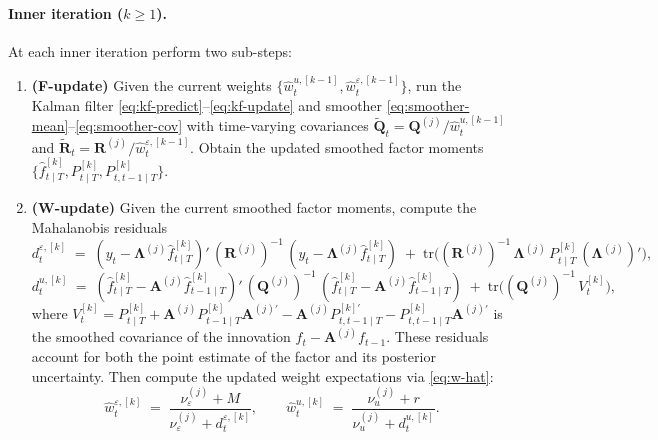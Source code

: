 \documentclass[11pt, a4paper, oneside]{article}
\newcommand{\mL}{\boldsymbol{\Lambda}}
\newcommand{\mA}{\mathbf{A}}
\newcommand{\mR}{\mathbf{R}}
\newcommand{\mQ}{\mathbf{Q}}
\begin{document}
\paragraph{Inner iteration ($k \geq 1$).}
At each inner iteration perform two sub-steps:
\begin{enumerate}[leftmargin=1.5em, itemsep=3pt]
    \item \textbf{(F-update)} Given the current weights
          $\{\hat{w}^{u,[k-1]}_t, \hat{w}^{\varepsilon,[k-1]}_t\}$, run
          the Kalman filter \eqref{eq:kf-predict}--\eqref{eq:kf-update}
          and smoother \eqref{eq:smoother-mean}--\eqref{eq:smoother-cov}
          with time-varying covariances
          $\tilde{\mQ}_t = \mQ^{(j)} / \hat{w}^{u,[k-1]}_t$ and
          $\tilde{\mR}_t = \mR^{(j)} / \hat{w}^{\varepsilon,[k-1]}_t$.
          Obtain the updated smoothed factor moments
          $\{\hat{f}_{t \mid T}^{[k]}, P_{t \mid T}^{[k]}, P_{t, t-1 \mid T}^{[k]}\}$.
    \item \textbf{(W-update)} Given the current smoothed factor moments,
          compute the Mahalanobis residuals
          \[
          d^{\varepsilon,[k]}_t \;=\; (y_t - \mL^{(j)} \hat{f}_{t \mid T}^{[k]})'\, (\mR^{(j)})^{-1}\, (y_t - \mL^{(j)} \hat{f}_{t \mid T}^{[k]})
                                 \;+\; \mathrm{tr}\!\big((\mR^{(j)})^{-1}\, \mL^{(j)}\, P_{t \mid T}^{[k]}\, (\mL^{(j)})'\big),
          \]
          \[
          d^{u,[k]}_t \;=\; (\hat{f}_{t \mid T}^{[k]} - \mA^{(j)} \hat{f}_{t-1 \mid T}^{[k]})'\, (\mQ^{(j)})^{-1}\, (\hat{f}_{t \mid T}^{[k]} - \mA^{(j)} \hat{f}_{t-1 \mid T}^{[k]})
                          \;+\; \mathrm{tr}\!\big((\mQ^{(j)})^{-1}\, V^{[k]}_t\big),
          \]
          where $V^{[k]}_t = P_{t \mid T}^{[k]} + \mA^{(j)} P_{t-1 \mid T}^{[k]} \mA^{(j)\prime} - \mA^{(j)} P_{t, t-1 \mid T}^{[k]\prime} - P_{t, t-1 \mid T}^{[k]} \mA^{(j)\prime}$
          is the smoothed covariance of the innovation $f_t - \mA^{(j)} f_{t-1}$.
          These residuals account for both the point estimate of the
          factor and its posterior uncertainty. Then compute the
          updated weight expectations via \eqref{eq:w-hat}:
          \[
          \hat{w}^{\varepsilon,[k]}_t \;=\; \frac{\nu_\varepsilon^{(j)} + M}{\nu_\varepsilon^{(j)} + d^{\varepsilon,[k]}_t},
          \qquad
          \hat{w}^{u,[k]}_t \;=\; \frac{\nu_u^{(j)} + r}{\nu_u^{(j)} + d^{u,[k]}_t}.
          \]
\end{enumerate}
\end{document}
